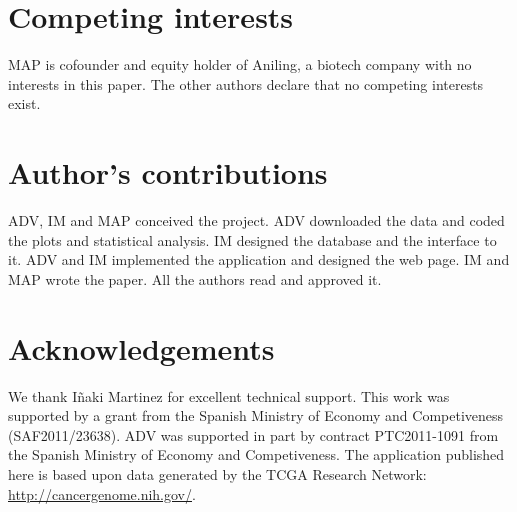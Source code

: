 \documentclass{bmcart}
\begin{document}
\begin{backmatter}

\section*{Competing interests}
MAP is cofounder and equity holder of Aniling, a biotech company with no interests in this paper. The other authors declare that no competing interests exist.

\section*{Author's contributions}
   ADV, IM and MAP conceived the project. ADV downloaded the data and coded the plots and statistical analysis. IM designed the database and the interface to it. ADV and IM implemented the application and designed the web page. IM and MAP wrote the paper. All the authors read and approved it.

\section*{Acknowledgements}
We thank Iñaki Martinez for excellent technical support. This work was supported by a grant from the Spanish Ministry of Economy and Competiveness (SAF2011/23638). ADV was supported in part by contract PTC2011-1091 from the Spanish Ministry of Economy and Competiveness. The application published here is based upon data generated by the TCGA Research Network: \url{http://cancergenome.nih.gov/}. 







\end{backmatter}
\end{document}
